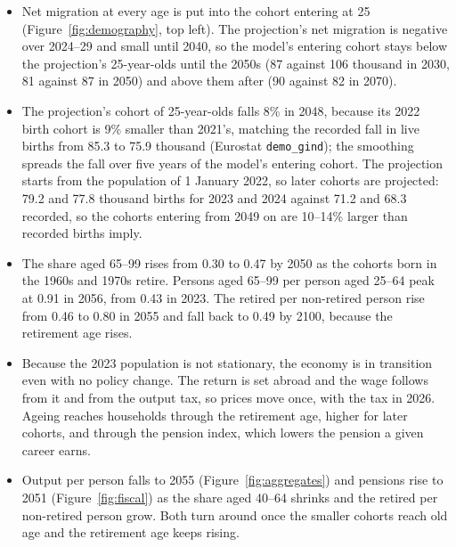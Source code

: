 \documentclass[11pt,a4paper]{article}
\begin{document}
\begin{itemize}
  the projection, because net migration was 30 thousand in 2023 and 54
  thousand in 2024 against the projection's 5 and $-2$; live births in
  2023--24 were 10--12\% below the projection's; life expectancy at 65 in
  2024 was 18.7 years for men and 21.8 for women, 0.5 and 0.3 below the
  assumption. The old-age ratio on 1 January 2025, 40.9 per 100, is the
  projection's.
\item Net migration at every age is put into the cohort entering at 25
  (Figure~\ref{fig:demography}, top left). The projection's net migration
  is negative over 2024--29 and small until 2040, so the model's entering
  cohort stays below the projection's 25-year-olds until the 2050s (87
  against 106 thousand in 2030, 81 against 87 in 2050) and above them after
  (90 against 82 in 2070).
\item The projection's cohort of 25-year-olds falls 8\% in 2048, because
  its 2022 birth cohort is 9\% smaller than 2021's, matching the recorded
  fall in live births from 85.3 to 75.9 thousand (Eurostat
  \texttt{demo\_gind}); the smoothing spreads the fall over five years of
  the model's entering cohort. The projection starts from
  the population of 1 January 2022, so later cohorts are projected: 79.2 and
  77.8 thousand births for 2023 and 2024 against 71.2 and 68.3 recorded, so
  the cohorts entering from 2049 on are 10--14\% larger than recorded births
  imply.
\item The share aged 65--99 rises from 0.30 to 0.47 by 2050 as the cohorts
  born in the 1960s and 1970s retire. Persons aged 65--99 per person aged
  25--64 peak at 0.91 in 2056, from 0.43 in 2023. The retired per non-retired
  person rise from 0.46 to 0.80 in 2055 and fall back to 0.49 by 2100,
  because the retirement age rises.
\item Because the 2023 population is not stationary, the economy is in
  transition even with no policy change. The return is set abroad and the
  wage follows from it and from the output tax, so prices move once, with
  the tax in 2026. Ageing reaches households through
  the retirement age, higher for later cohorts, and through the pension index,
  which lowers the pension a given career earns.
\item Output per person falls to 2055 (Figure~\ref{fig:aggregates}) and
  pensions rise to 2051 (Figure~\ref{fig:fiscal}) as the share aged 40--64
  shrinks and the retired per non-retired person grow. Both turn around once
  the smaller cohorts reach old age and the retirement age keeps rising.
\end{itemize}
\end{document}
